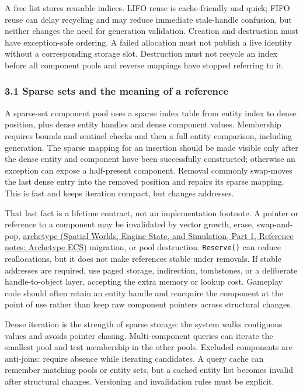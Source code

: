 A free list stores reusable indices. LIFO reuse is cache-friendly and quick; FIFO reuse can delay recycling and may reduce immediate stale-handle confusion, but neither changes the need for generation validation. Creation and destruction must have exception-safe ordering. A failed allocation must not publish a live identity without a corresponding storage slot. Destruction must not recycle an index before all component pools and reverse mappings have stopped referring to it.

\subsubsection{3.1 Sparse sets and the meaning of a reference}\label{05-engine-i-ch008-sparse-sets-and-the-meaning-of-a-reference}

\hypertarget{05-engine-i-ch008-sparse-sets-and-the-meaning-of-a-reference}{}

A sparse-set component pool uses a sparse index table from entity index to dense position, plus dense entity handles and dense component values. Membership requires bounds and sentinel checks and then a full entity comparison, including generation. The sparse mapping for an insertion should be made visible only after the dense entity and component have been successfully constructed; otherwise an exception can expose a half-present component. Removal commonly swap-moves the last dense entry into the removed position and repairs its sparse mapping. This is fast and keeps iteration compact, but changes addresses.

That last fact is a lifetime contract, not an implementation footnote. A pointer or reference to a component may be invalidated by vector growth, erase, swap-and-pop, \href{../05-Spatial-Worlds-Engine-State-and-Simulation-P01/main.pdf\#nameddest=appendix-fbfeb0430008}{archetype (Spatial Worlds, Engine State, and Simulation, Part 1, Reference notes: Archetype ECS)} migration, or pool destruction. \texttt{Reserve()} can reduce reallocations, but it does not make references stable under removals. If stable addresses are required, use paged storage, indirection, tombstones, or a deliberate handle-to-object layer, accepting the extra memory or lookup cost. Gameplay code should often retain an entity handle and reacquire the component at the point of use rather than keep raw component pointers across structural changes.

Dense iteration is the strength of sparse storage: the system walks contiguous values and avoids pointer chasing. Multi-component queries can iterate the smallest pool and test membership in the other pools. Excluded components are anti-joins: require absence while iterating candidates. A query cache can remember matching pools or entity sets, but a cached entity list becomes invalid after structural changes. Versioning and invalidation rules must be explicit.

